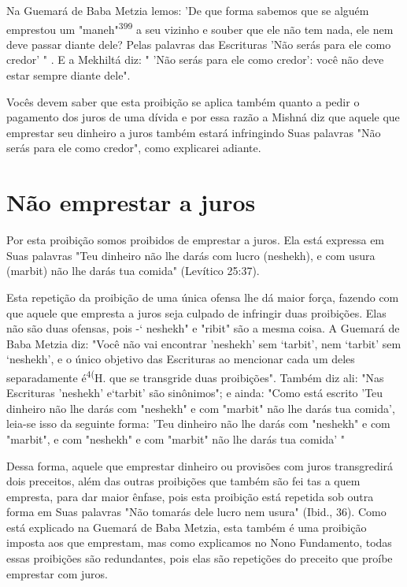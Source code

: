 \begin{itemize}
\begin{enumrate}
\begin{itemize}
\begin{itemize}
\begin{itemize}
Na Guemará de Baba Metzia lemos: 'De que forma sabemos que se alguém
emprestou um "maneh"\textsuperscript{399} a seu vizinho e souber que ele
não tem na­da, ele nem deve passar diante dele? Pelas palavras das
Escrituras 'Não serás para ele como credor' " . E a Mekhiltá diz: " 'Não
serás para ele como credor': você não deve estar sempre diante dele".

Vocês devem saber que esta proibição se aplica também quanto a pedir o
pagamento dos juros de uma dívida e por essa razão a Mishná diz que
aquele que emprestar seu dinheiro a juros também estará infringindo Suas
pala­vras "Não serás para ele como credor", como explicarei adiante.

\section{Não emprestar a juros}

Por esta proibição somos proibidos de emprestar a juros. Ela está
expressa em Suas palavras "Teu dinheiro não lhe darás com lucro
(neshekh), e com usura (marbit) não lhe darás tua comida" (Levítico
25:37).

Esta repetição da proibição de uma única ofensa lhe dá maior força,
fazendo com que aquele que empresta a juros seja culpado de infringir
duas proibições. Elas não são duas ofensas, pois -` neshekh" e "ribit"
são a mesma coisa. A Guemará de Baba Metzia diz: "Você não vai encontrar
'neshekh' sem `tarbit', nem `tarbit' sem `neshekh', e o único objetivo
das Escrituras ao men­cionar cada um deles separadamente
é\textsuperscript{4(}H. que se transgride duas
proibições". Também diz ali: "Nas Escrituras 'neshekh' e`tarbit' são
sinônimos"; e ainda: "Como está escrito 'Teu dinheiro não lhe darás com
"neshekh" e com "mar­bit" não lhe darás tua comida', leia-se isso da
seguinte forma: 'Teu dinheiro não lhe darás com "neshekh" e com
"marbit", e com "neshekh" e com "mar­bit" não lhe darás tua comida' "

Dessa forma, aquele que emprestar dinheiro ou provisões com ju­ros
transgredirá dois preceitos, além das outras proibições que também são
fei tas a quem empresta, para dar maior ênfase, pois esta proibição está
repetida sob outra forma em Suas palavras "Não tomarás dele lucro nem
usura" (Ibid., 36). Como está explicado na Guemará de Baba Metzia, esta
também é uma proi­bição imposta aos que emprestam, mas como explicamos
no Nono Fundamen­to, todas essas proibições são redundantes, pois elas
são repetições do preceito que proíbe emprestar com juros.



\end{itemize}
\end{itemize}
\end{itemize}
\end{enumrate}
\end{itemize}
